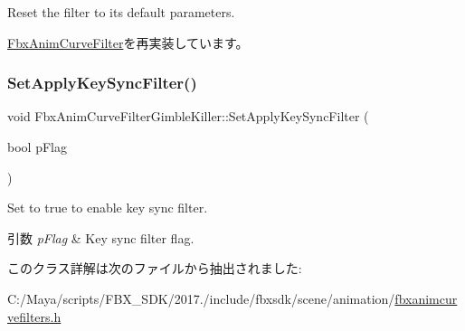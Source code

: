 Reset the filter to its default parameters. 

\hyperlink{class_fbx_anim_curve_filter_a57fb35baaaa85adb08946383cf40e811}{Fbx\+Anim\+Curve\+Filter}を再実装しています。

\mbox{\label{class_fbx_anim_curve_filter_gimble_killer_a39cedf804e69f86d5d2e8a95d92f98f2}} 
\subsubsection{\texorpdfstring{Set\+Apply\+Key\+Sync\+Filter()}{SetApplyKeySyncFilter()}}
{\footnotesize\ttfamily void Fbx\+Anim\+Curve\+Filter\+Gimble\+Killer\+::\+Set\+Apply\+Key\+Sync\+Filter (\begin{DoxyParamCaption}\item[{bool}]{p\+Flag }\end{DoxyParamCaption})}

Set to {\ttfamily true} to enable key sync filter. 
\begin{DoxyParams}{引数}
{\em p\+Flag} & Key sync filter flag. \\
\hline
\end{DoxyParams}


このクラス詳解は次のファイルから抽出されました\+:\begin{DoxyCompactItemize}
\item 
C\+:/\+Maya/scripts/\+F\+B\+X\+\_\+\+S\+D\+K/2017./include/fbxsdk/scene/animation/\hyperlink{fbxanimcurvefilters_8h}{fbxanimcurvefilters.\+h}\end{DoxyCompactItemize}
